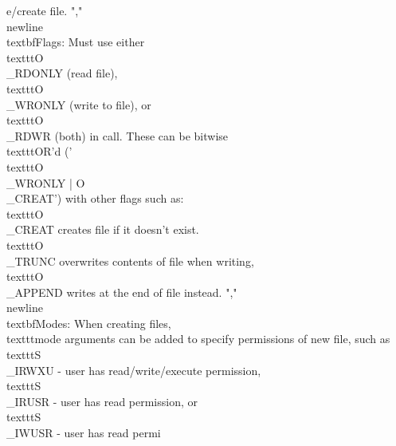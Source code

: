 e/create file. ","    \\newline\\textbf{Flags:} Must use either \\texttt{O\\_RDONLY} (read file), \\texttt{O\\_WRONLY} (write to file), or \\texttt{O\\_RDWR} (both) in call. These can be bitwise \\texttt{OR}'d ('\\texttt{O\\_WRONLY | O\\_CREAT}') with other flags such as:  \\texttt{O\\_CREAT} creates file if it doesn't exist. \\texttt{O\\_TRUNC} overwrites contents of file when writing, \\texttt{O\\_APPEND} writes at the end of file instead. ","    \\newline\\textbf{Modes:} When creating files, \\texttt{mode} arguments can be added to specify permissions of new file, such as \\texttt{S\\_IRWXU} - user has read/write/execute permission, \\texttt{S\\_IRUSR} - user has read permission, or \\texttt{S\\_IWUSR} - user has read permi